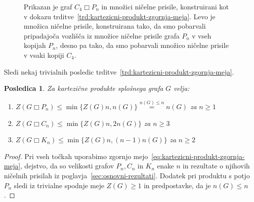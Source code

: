 \documentclass[12pt,a4paper,twoside]{article}
\theoremstyle{definition} %
\theoremstyle{plain} %
\newtheorem{posledica}[definicija]{Posledica}
\numberwithin{equation}{section}  %
\DeclareMathOperator{\boxempty}{\Box}
\begin{document}
\begin{figure}[h]
\begin{subfigure}{0.49\textwidth}
    \end{subfigure}
    \caption{Prikazan je graf $C_4 \boxempty P_n$ in množici ničelne prisile, konstruirani kot v dokazu trditve~\ref{trd:kartezicni-produkt-zgornja-meja}. Levo je množica ničelne prisile, konstruirana tako, da smo pobarvali pripadajoča vozlišča iz množice ničelne prisile grafa $P_n$ v vseh kopijah $P_n$, desno pa tako, da smo pobarvali množico ničelne prisile v vsaki kopiji $C_4$.}
    \label{fig:zf-kartezicni-produkt}
\end{figure}

Sledi nekaj trivialnih posledic trditve~\ref{trd:kartezicni-produkt-zgornja-meja}.
\begin{posledica}
    \label{posl:kartezicni-produkt-zgornje-meje-pot-cikel-polni}
    Za kartezične produkte splošnega grafa $G$ velja:
    \begin{enumerate}
        \item $Z(G \boxempty P_n) \leq \min \{ Z(G)n, n(G) \} \stackrel{n(G) \leq n}{=} n(G)$ za $n \geq 1$
        \label{itm:meja-kartezicni-s-potjo}
        \item $Z(G \boxempty C_n) \leq \min \{ Z(G)n, 2n(G) \}$ za $n \geq 3$
        \item $Z(G \boxempty K_n) \leq \min \{ Z(G)n, (n-1)n(G) \}$ za $n \geq 2$
    \end{enumerate}
\end{posledica}
\begin{proof}
    Pri vseh točkah uporabimo zgornjo mejo~\eqref{eq:kartezicni-produkt-zgornja-meja}, dejstvo, da so velikosti grafov $P_n, C_n$ in $K_n$ enake $n$ in rezultate o njihovih ničelnih prisilah iz poglavja~\ref{sec:osnovni-rezultati}. Dodatek pri produktu s potjo $P_n$ sledi iz trivialne spodnje meje $Z(G) \geq 1$ in predpostavke, da je $n(G) \leq n$.
\end{proof}
\end{document}
